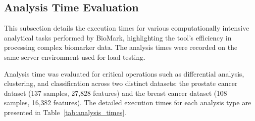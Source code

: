 \documentclass[journal]{IEEEtran}
\begin{document}
\subsection{Analysis Time Evaluation}
This subsection details the execution times for various computationally intensive analytical tasks performed by BioMark, highlighting the tool's efficiency in processing complex biomarker data. The analysis times were recorded on the same server environment used for load testing.

Analysis time was evaluated for critical operations such as differential analysis, clustering, and classification across two distinct datasets: the prostate cancer dataset (137 samples, 27,828 features) and the breast cancer dataset (108 samples, 16,382 features). The detailed execution times for each analysis type are presented in Table~\ref{tab:analysis_times}.
\end{document}

